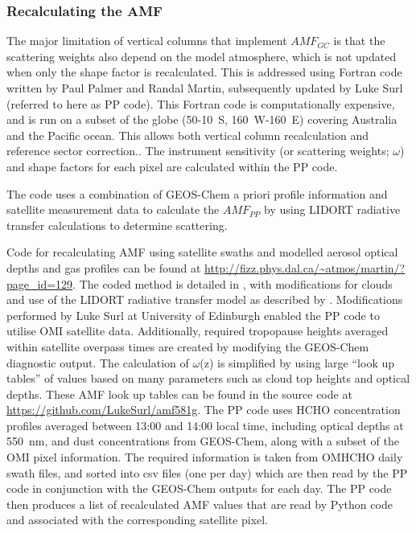     \subsubsection{Recalculating the AMF}
      \label{Model:omiRecalc:ppcode}
      
      
      The major limitation of vertical columns that implement $AMF_{GC}$ is that the scattering weights also depend on the model atmosphere, which is not updated when only the shape factor is recalculated.
      This is addressed using Fortran code written by Paul Palmer and Randal Martin, subsequently updated by Luke Surl (referred to here as PP code).
      This Fortran code is computationally expensive, and is run on a subset of the globe (50-10\degr~S, 160\degr~W-160\degr~E) covering Australia and the Pacific ocean.
      This allows both vertical column recalculation and reference sector correction..
      The instrument sensitivity (or scattering weights; $\omega$) and shape factors for each pixel are calculated within the PP code.
      
      The code uses a combination of GEOS-Chem a priori profile information and satellite measurement data to calculate the $AMF_{PP}$ by using LIDORT radiative transfer calculations to determine scattering.
      
      
      Code for recalculating AMF using satellite swaths and modelled aerosol optical depths and gas profiles can be found at \url{http://fizz.phys.dal.ca/~atmos/martin/?page_id=129}. 
      The coded method is detailed in \textcite{Palmer2001}, with modifications for clouds and use of the LIDORT radiative transfer model \parencite{Spurr2002} as described by \textcite{Martin2003aer}.
      Modifications performed by Luke Surl at University of Edinburgh enabled the PP code to utilise OMI satellite data.
      Additionally, required tropopause heights averaged within satellite overpass times are created by modifying the GEOS-Chem diagnostic output.
      The calculation of $\omega$(z) is simplified by using large ``look up tables'' of values based on many parameters such as cloud top heights and optical depths.
      These AMF look up tables can be found in the source code at \url{https://github.com/LukeSurl/amf581g}.
      The PP code uses HCHO concentration profiles averaged between 13:00 and 14:00 local time, including optical depths at 550~nm, and dust concentrations from GEOS-Chem, along with a subset of the OMI pixel information.
      The required information is taken from OMHCHO daily swath files, and sorted into csv files (one per day) which are then read by the PP code in conjunction with the GEOS-Chem outputs for each day.
      The PP code then produces a list of recalculated AMF values that are read by Python code and associated with the corresponding satellite pixel.
    
